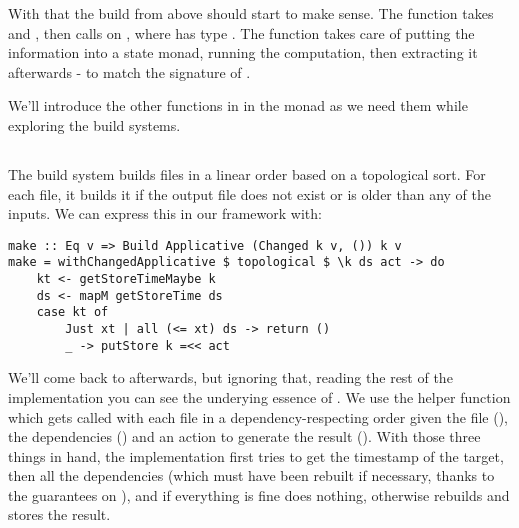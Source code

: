 


With that the  build from above should start to make sense. The function  takes  and , then calls  on , where  has type . The  function takes care of putting the information into a state monad, running the computation, then extracting it afterwards - to match the signature of .

We'll introduce the other functions in in the monad  as we need them while exploring the build systems.

\subsection{\Make}\label{sec-implementation-make}

The \Make build system builds files in a linear order based on a topological sort. For each file, it builds it if the output file does not exist or is older than any of the inputs. We can express this in our framework with:

\begin{verbatim}
make :: Eq v => Build Applicative (Changed k v, ()) k v
make = withChangedApplicative $ topological $ \k ds act -> do
    kt <- getStoreTimeMaybe k
    ds <- mapM getStoreTime ds
    case kt of
        Just xt | all (<= xt) ds -> return ()
        _ -> putStore k =<< act
\end{verbatim}

We'll come back to  afterwards, but ignoring that, reading the rest of the implementation you can see the underying essence of \Make. We use the helper function  which gets called with each file in a dependency-respecting order given the file (), the dependencies () and an action to generate the result (). With those three things in hand, the implementation first tries to get the timestamp of the target, then all the dependencies (which must have been rebuilt if necessary, thanks to the guarantees on ), and if everything is fine does nothing, otherwise rebuilds and stores the result.

